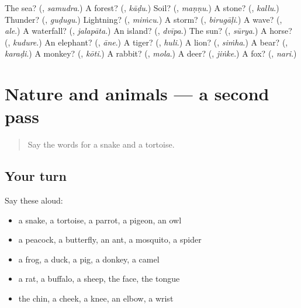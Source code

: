 \begin{tcolorbox}[breakable,colback=teal!4,colframe=teal!35!black,title={Before you move on}]
The sea? (\textbf{}, \emph{samudra}.) A forest? (\textbf{}, \emph{kāḍu}.) Soil? (\textbf{}, \emph{maṇṇu}.) A stone? (\textbf{}, \emph{kallu}.) Thunder? (\textbf{}, \emph{guḍugu}.) Lightning? (\textbf{}, \emph{miṁcu}.) A storm? (\textbf{}, \emph{birugāḷi}.) A wave? (\textbf{}, \emph{ale}.) A waterfall? (\textbf{}, \emph{jalapāta}.) An island? (\textbf{}, \emph{dvīpa}.) The sun? (\textbf{}, \emph{sūrya}.) A horse? (\textbf{}, \emph{kudure}.) An elephant? (\textbf{}, \emph{āne}.) A tiger? (\textbf{}, \emph{huli}.) A lion? (\textbf{}, \emph{siṁha}.) A bear? (\textbf{}, \emph{karaḍi}.) A monkey? (\textbf{}, \emph{kōti}.) A rabbit? (\textbf{}, \emph{mola}.) A deer? (\textbf{}, \emph{jiṅke}.) A fox? (\textbf{}, \emph{nari}.)
\end{tcolorbox}
\section[(dialogue)]{Nature and animals — a second pass}

\label{lesson:KA-R135-second-pass-nature-and-animals}



\begin{quote}
Say the words for a snake and a tortoise.
\end{quote}

\subsection*{Your turn}
Say these aloud:

\begin{itemize}
\raggedright
  \item a snake, a tortoise, a parrot, a pigeon, an owl
  \item a peacock, a butterfly, an ant, a mosquito, a spider
  \item a frog, a duck, a pig, a donkey, a camel
  \item a rat, a buffalo, a sheep, the face, the tongue
  \item the chin, a cheek, a knee, an elbow, a wrist
\end{itemize}

